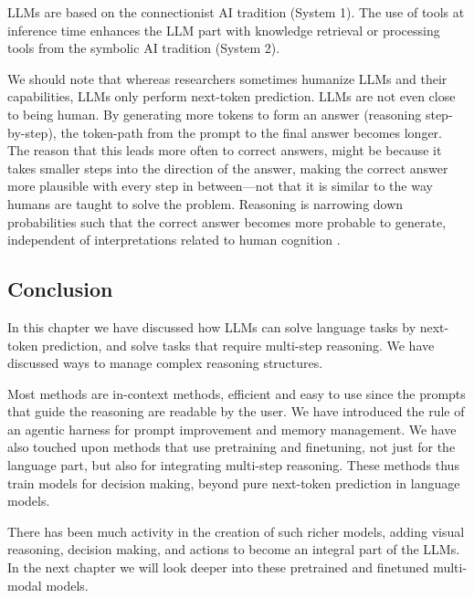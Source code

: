 LLMs are based on the connectionist AI tradition (System 1). The
use of  tools at inference time enhances the LLM part with
knowledge retrieval or processing tools from the symbolic AI tradition
(System 2).

We should note that whereas researchers sometimes  humanize LLMs and their capabilities,  LLMs only perform next-token prediction. LLMs are not even close to being human. By generating more tokens to form an answer (reasoning step-by-step), the token-path from the prompt to the final answer becomes longer. The reason that this leads more often to  correct answers, might be because it takes smaller steps into the direction of the answer, making the correct answer more plausible with every step in between---not that it is similar to the way humans are taught to solve the problem.  Reasoning is narrowing down probabilities such that the correct answer becomes more probable to generate, independent  of  interpretations related to human cognition \citep{guo2025deepseek}. 

\subsection{Conclusion}
In this chapter we have  discussed how LLMs can solve language tasks by next-token prediction, and  solve tasks that require multi-step reasoning. We have discussed ways to manage complex reasoning structures.

Most methods %
are in-context methods, efficient and easy to use since the prompts that guide the reasoning are readable by the user. We have introduced the rule of an agentic harness for prompt improvement and memory management. We have also touched upon methods that use pretraining and finetuning, not just for the language part, but also  for integrating multi-step reasoning. These methods thus train models for decision making, beyond pure next-token prediction in language models. %

There has been much activity in the creation of such  richer models, adding visual reasoning, decision making, and actions to become an integral part of the LLMs. In the next chapter we will look deeper into these pretrained and finetuned multi-modal models.



